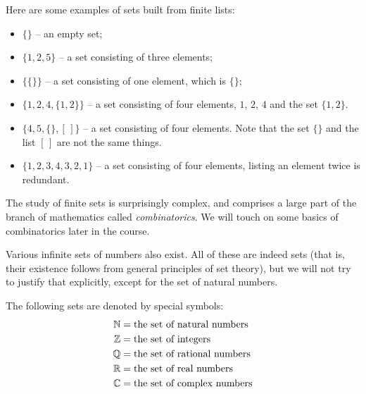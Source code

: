 \printbreak

\begin{example}
Here are some examples of sets built from finite lists:
\begin{itemize}
\item $\{\}$ -- an empty set;
\item $\{1,2,5\}$ -- a set consisting of three elements;
\item $\{\{\}\}$ -- a set consisting of one element, which is $\{\}$;
\item $\{1,2,4,\{1,2\}\}$ -- a set consisting of four elements, $1$,
  $2$, $4$ and the set $\{1,2\}$.
\item $\{4,5, \{\}, [\,]\}$ -- a set consisting of four elements. Note that
the set $\{\}$ and the list $[\,]$ are not the same things.
\item $\{1,2,3,4,3,2,1\}$ -- a set consisting of four elements, listing an element twice is redundant.
\end{itemize}
\end{example}

The study of finite sets is surprisingly complex, and comprises a large part of
the branch of mathematics called \emph{combinatorics}. We will touch on some basics
of combinatorics later in the course. 

Various infinite sets of numbers also exist. All of these are indeed sets (that is, their existence follows from general principles
of set theory), but we will not try to justify that explicitly, except for the set of natural numbers.

\begin{defn}
	The following sets are denoted by special symbols:
	\begin{align*}
		\mathbb N &= \text{the set of natural numbers}\\
		\mathbb Z &= \text{the set of integers}\\
		\mathbb Q &= \text{the set of rational numbers}\\
		\mathbb R &= \text{the set of real numbers}\\
		\mathbb C &= \text{the set of complex numbers}
	\end{align*}
\end{defn}


